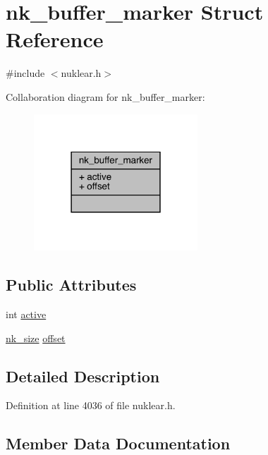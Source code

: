 \hypertarget{structnk__buffer__marker}{}\section{nk\+\_\+buffer\+\_\+marker Struct Reference}
\label{structnk__buffer__marker}


{\ttfamily \#include $<$nuklear.\+h$>$}



Collaboration diagram for nk\+\_\+buffer\+\_\+marker\+:
\nopagebreak
\begin{figure}[H]
\begin{center}
\leavevmode
\includegraphics[width=174pt]{structnk__buffer__marker__coll__graph}
\end{center}
\end{figure}
\subsection*{Public Attributes}
\begin{DoxyCompactItemize}
\item 
int \mbox{\hyperlink{structnk__buffer__marker_a0622d1f7f727acd9f3cded6595c7ebd0}{active}}
\item 
\mbox{\hyperlink{nuklear_8h_a84c0fc50dec5501be327b33d41d9010c}{nk\+\_\+size}} \mbox{\hyperlink{structnk__buffer__marker_a225c3628eb1e93f2400496110c4bd87a}{offset}}
\end{DoxyCompactItemize}


\subsection{Detailed Description}


Definition at line 4036 of file nuklear.\+h.



\subsection{Member Data Documentation}
\mbox{\label{structnk__buffer__marker_a0622d1f7f727acd9f3cded6595c7ebd0}} 
